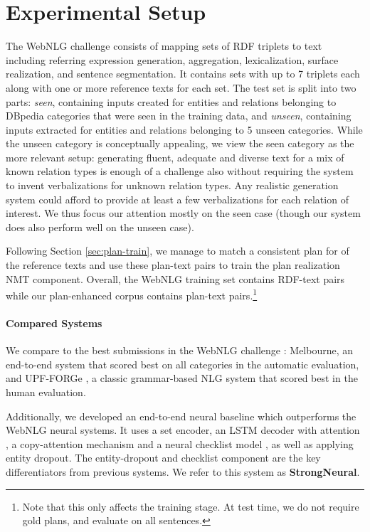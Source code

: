 \documentclass[11pt,a4paper]{article}
\newcommand\ourbaseline[0]{StrongNeural}
\begin{document}
\section{Experimental Setup}
The WebNLG challenge \cite{colin2016webnlg} consists of mapping sets of RDF triplets to text including referring expression generation, aggregation, lexicalization, surface realization, and sentence segmentation. It contains sets with up to 7 triplets each along with one or more reference texts for each set. The test set is split into two parts: \emph{seen}, containing inputs created for entities and relations belonging to DBpedia categories that were seen in the training data, and \emph{unseen}, containing inputs extracted for entities and relations belonging to 5 unseen categories. While the unseen category is conceptually appealing, we view the seen category as the more relevant setup: generating fluent, adequate and diverse text for a mix of known relation types is enough of a challenge also without requiring the system to invent verbalizations for unknown relation types. Any realistic generation system could afford to provide at least a few verbalizations for each relation of interest. We thus focus our attention mostly on the seen case (though our system does also perform well on the unseen case).

Following Section \ref{sec:plan-train}, we manage to match a consistent plan for  of the reference texts and use these plan-text pairs to train the plan realization NMT component. Overall, the WebNLG training set contains  RDF-text pairs while our plan-enhanced corpus contains  plan-text pairs.\footnote{Note that this only affects the training stage. At test time, we do not require gold plans, and evaluate on all sentences.}

\paragraph{Compared Systems}
We compare to the best submissions in the WebNLG challenge \cite{gardent2017webnlg}: Melbourne, an end-to-end system that scored best on all categories in the automatic evaluation, and UPF-FORGe \cite{mille2017forge}, a classic grammar-based NLG system that scored best in the human evaluation.

Additionally, we developed an end-to-end neural baseline which outperforms the WebNLG neural systems. It uses a set encoder, an LSTM \cite{hochreiter1997long} decoder with attention \cite{attention}, a copy-attention mechanism \cite{gulcehre2016pointing} and a neural checklist model \cite{kiddon2016globally}, as well as applying entity dropout. The entity-dropout and checklist component are the key differentiators from previous systems. 
We refer to this system as \textbf{\ourbaseline}.
\end{document}
